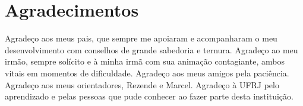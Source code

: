 \chapter*{Agradecimentos}

Agradeço aos meus pais, que sempre me apoiaram e acompanharam o meu desenvolvimento com conselhos de grande sabedoria e ternura. Agradeço ao meu irmão, sempre solícito e à minha irmã com sua animação contagiante, ambos vitais em momentos de dificuldade. Agradeço aos meus amigos pela paciência. Agradeço aos meus orientadores, Rezende e Marcel. Agradeço à UFRJ pelo aprendizado e pelas pessoas que pude conhecer ao fazer parte desta instituição.